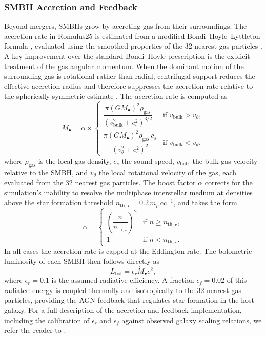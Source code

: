 \documentclass[twocolumn, 10pt]{article}
\begin{document}
\subsubsection{SMBH Accretion and Feedback}
\label{subsubsec:growth}

Beyond mergers, SMBHs grow by accreting gas from their surroundings. The accretion rate in Romulus25 is estimated from a modified Bondi--Hoyle--Lyttleton formula \citep{Bondi1952}, evaluated using the smoothed properties of the 32 nearest gas particles \citep{Tremmel2017}. A key improvement over the standard Bondi--Hoyle prescription is the explicit treatment of the gas angular momentum. When the dominant motion of the surrounding gas is rotational rather than radial, centrifugal support reduces the effective accretion radius and therefore suppresses the accretion rate relative to the spherically symmetric estimate \citep{Hopkins2010}. The accretion rate is computed as
%
\begin{equation}
    \dot{M}_\bullet = \alpha \times
    \begin{cases}
        \dfrac{\pi (G M_\bullet)^2 \rho_\mathrm{gas}}{(v_\mathrm{bulk}^2 + c_s^2)^{3/2}} & \text{if } v_\mathrm{bulk} > v_\theta, \\[10pt]
        \dfrac{\pi (G M_\bullet)^2 \rho_\mathrm{gas}\, c_s}{(v_\theta^2 + c_s^2)^{2}} & \text{if } v_\mathrm{bulk} < v_\theta,
    \end{cases}
    \label{eq:bondi}
\end{equation}
%
where $\rho_\mathrm{gas}$ is the local gas density, $c_s$ the sound speed, $v_\mathrm{bulk}$ the bulk gas velocity relative to the SMBH, and $v_\theta$ the local rotational velocity of the gas, each evaluated from the 32 nearest gas particles. The boost factor $\alpha$ corrects for the simulation's inability to resolve the multiphase interstellar medium at densities above the star formation threshold $n_{\mathrm{th},\star} = 0.2\,m_p\,\mathrm{cc}^{-1}$, and takes the form
%
\begin{equation}
    \alpha =
    \begin{cases}
        \left(\dfrac{n}{n_{\mathrm{th},\star}}\right)^{2} & \text{if } n \geq n_{\mathrm{th},\star}, \\[8pt]
        1 & \text{if } n < n_{\mathrm{th},\star}.
    \end{cases}
    \label{eq:alpha}
\end{equation}
%
In all cases the accretion rate is capped at the Eddington rate. The bolometric luminosity of each SMBH then follows directly as
%
\begin{equation}
    L_\mathrm{bol} = \epsilon_r \dot{M}_\bullet c^2,
    \label{eq:lbol}
\end{equation}
%
where $\epsilon_r = 0.1$ is the assumed radiative efficiency. A fraction $\epsilon_f = 0.02$ of this radiated energy is coupled thermally and isotropically to the 32 nearest gas particles, providing the AGN feedback that regulates star formation in the host galaxy. For a full description of the accretion and feedback implementation, including the calibration of $\epsilon_r$ and $\epsilon_f$ against observed galaxy scaling relations, we refer the reader to \citet{Tremmel2017}.
\end{document}

